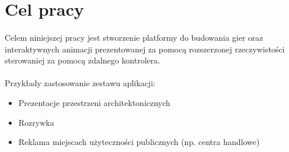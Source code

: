 \section{Cel pracy}
\paragraph{}
Celem niniejszej pracy jest stworzenie platformy do budowania gier oraz interaktywnych animacji prezentowanej za pomocą rozszerzonej rzeczywistości sterowaniej za pomocą zdalnego kontrolera.

\paragraph{}
Przykłady zastosowanie zestawu aplikacji:

\begin{itemize}
	\item Prezentacje przestrzeni architektonicznych
	\item Rozrywka
	\item Reklama miejscach użyteczności publicznych (np. centra handlowe)
\end{itemize}
